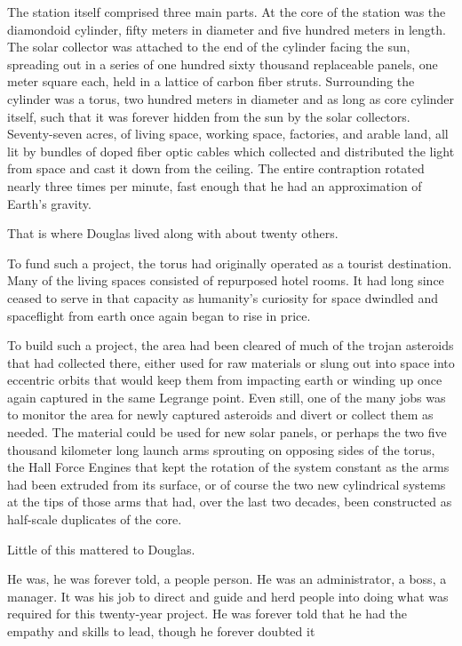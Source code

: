 The station itself comprised three main parts. At the core of the station was the diamondoid cylinder, fifty meters in diameter and five hundred meters in length. The solar collector was attached to the end of the cylinder facing the sun, spreading out in a series of one hundred sixty thousand replaceable panels, one meter square each, held in a lattice of carbon fiber struts. Surrounding the cylinder was a torus, two hundred meters in diameter and as long as core cylinder itself, such that it was forever hidden from the sun by the solar collectors. Seventy-seven acres, of living space, working space, factories, and arable land, all lit by bundles of doped fiber optic cables which collected and distributed the light from space and cast it down from the ceiling. The entire contraption rotated nearly three times per minute, fast enough that he had an approximation of Earth's gravity.

That is where Douglas lived along with about twenty others.

To fund such a project, the torus had originally operated as a tourist destination. Many of the living spaces consisted of repurposed hotel rooms. It had long since ceased to serve in that capacity as humanity's curiosity for space dwindled and spaceflight from earth once again began to rise in price.

To build such a project, the area had been cleared of much of the trojan asteroids that had collected there, either used for raw materials or slung out into space into eccentric orbits that would keep them from impacting earth or winding up once again captured in the same Legrange point. Even still, one of the many jobs was to monitor the area for newly captured asteroids and divert or collect them as needed. The material could be used for new solar panels, or perhaps the two five thousand kilometer long launch arms sprouting on opposing sides of the torus, the Hall Force Engines that kept the rotation of the system constant as the arms had been extruded from its surface, or of course the two new cylindrical systems at the tips of those arms that had, over the last two decades, been constructed as half-scale duplicates of the core.

Little of this mattered to Douglas.

He was, he was forever told, a people person. He was an administrator, a boss, a manager. It was his job to direct and guide and herd people into doing what was required for this twenty-year project. He was forever told that he had the empathy and skills to lead, though he forever doubted it

